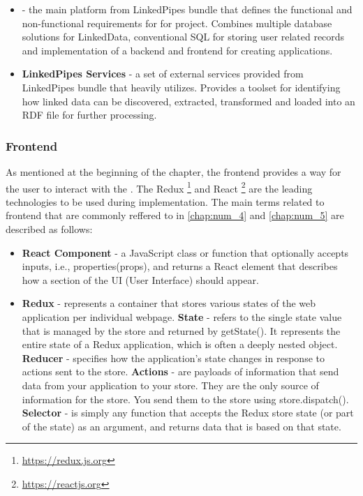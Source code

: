 \begin{itemize}
    \item \textbf{\lpa{}} - the main platform from LinkedPipes bundle that defines the functional and non-functional requirements for for \lpas{} project. Combines multiple database solutions for LinkedData, conventional SQL for storing user related records and implementation of a backend and frontend for creating applications.
    \item \textbf{LinkedPipes Services} - a set of external services provided from LinkedPipes bundle that \lpa{} heavily utilizes. Provides a toolset for identifying how linked data can be discovered, extracted, transformed and loaded into an RDF file for further processing.
\end{itemize}

\subsubsection{Frontend}

As mentioned at the beginning of the chapter, the frontend provides a way for the user to interact with the \lpa{}. The Redux \footnote{\url{https://redux.js.org}} and React \footnote{\url{https://reactjs.org}} are the leading technologies to be used during implementation. The main terms related to \lpa{} frontend that are commonly reffered to in \autoref{chap:num_4} and \autoref{chap:num_5} are described as follows:

\begin{itemize}
    \item \textbf{React Component} - a JavaScript class or function that optionally accepts inputs, i.e., properties(props), and returns a React element that describes how a section of the UI (User Interface) should appear. 
    \item \textbf{Redux} - represents a container that stores various states of the web application per individual webpage.
    	\subitem \textbf{State} - refers to the single state value that is managed by the store and returned by getState(). It represents the entire state of a Redux application, which is often a deeply nested object.
        \subitem \textbf{Reducer} - specifies how the application's state changes in response to actions sent to the store.
        \subitem \textbf{Actions} - are payloads of information that send data from your application to your store. They are the only source of information for the store. You send them to the store using store.dispatch().
        \subitem \textbf{Selector} - is simply any function that accepts the Redux store state (or part of the state) as an argument, and returns data that is based on that state.
\end{itemize}

